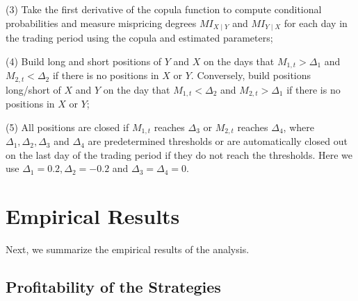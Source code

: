\documentclass[a4paper,12pt]{report}
\begin{document}
\begin{refsection}
	\vspace{0.3cm}
	\vspace{0.3cm}
	
	(3) Take the first derivative of the copula function to compute conditional
	probabilities and measure mispricing degrees $MI_{X\mid Y}$ and $MI_{Y\mid X}$ for each day in the trading period using the copula and estimated parameters;
	
	\vspace{0.3cm}
	\vspace{0.3cm}
	
	(4) Build long and short positions of $Y$ and $X$ on the days that $M_{1,t}>\Delta_{1}$ and $M_{2,t}<\Delta_{2}$ if there is no positions in $X$ or $Y$. Conversely, build positions long/short of $X$ and $Y$ on the day that $M_{1,t}<\Delta_{2}$ and $M_{2,t}>\Delta_{1}$ if there is no positions in $X$ or $Y$;
	
	\vspace{0.3cm}
	\vspace{0.3cm}
	
	(5) All positions are closed if $M_{1,t}$ reaches $\Delta_{3}$ or $M_{2,t}$ reaches $\Delta_{4}$, where $\Delta_{1},\Delta_{2},\Delta_{3}$ and $\Delta_{4}$ are predetermined thresholds or are automatically closed out on the last day of the trading period if they do not reach the thresholds. Here we use $\Delta_{1}=0.2, \Delta_{2}=-0.2$ and $\Delta_{3}=\Delta_{4}=0$.
	
	\vspace{0.6cm}
	
	\section{Empirical Results}
	
	Next, we summarize the empirical results of the analysis.
	
	\vspace{0.3cm}
	
	\subsection{Profitability of the Strategies}
	

\end{refsection}
\end{document}
